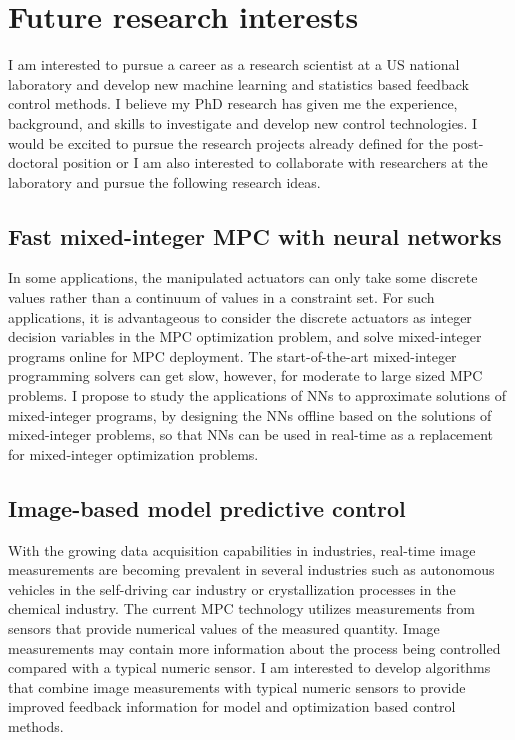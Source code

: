 \documentclass[11pt, a4paper]{article} %
\begin{document}
\section*{Future research interests}

I am interested to pursue a career as a research scientist at a US national 
laboratory and develop new machine learning and statistics based 
feedback control methods. I believe my PhD research has given me the 
experience, background, and skills to investigate and develop new control 
technologies. I would be excited to pursue the research projects already 
defined for the post-doctoral position or I am also interested to collaborate 
with researchers at the laboratory and pursue the following research ideas.

\subsection*{Fast mixed-integer MPC with neural networks}

In some applications, the manipulated actuators can only take some 
discrete values rather than a continuum of values in a constraint set. For such 
applications, it is advantageous to consider the discrete actuators as integer 
decision variables in the MPC optimization problem, and solve mixed-integer 
programs online for MPC deployment. The start-of-the-art mixed-integer 
programming solvers can get slow, however, for moderate to large sized MPC 
problems. I propose to study the applications of NNs to approximate solutions 
of mixed-integer programs, by designing the NNs offline based on the solutions 
of mixed-integer problems, so that NNs can be used in real-time as a 
replacement for  mixed-integer optimization problems.

\subsection*{Image-based model predictive control}

With the growing data acquisition capabilities in industries, real-time image 
measurements are becoming prevalent in several industries such as autonomous 
vehicles in the self-driving car industry or crystallization processes in the 
chemical industry. The current MPC technology utilizes measurements from 
sensors that provide numerical values of the measured quantity. Image 
measurements may contain more information about the process being controlled 
compared with a typical numeric sensor. I am interested to develop algorithms 
that combine image measurements with typical numeric sensors to provide 
improved feedback information for model and optimization based control methods.
\end{document}
